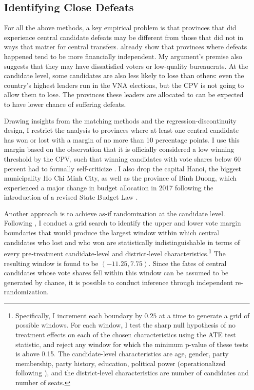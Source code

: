 \documentclass[12pt]{article}
\newcommand\fnote[1]{\footnote{\baselineskip=2\normalbaselineskip#1}}
\newcommand{\1}{\mathbbm{1}}
\begin{document}
\subsection{Identifying Close Defeats}
\label{sec:methods_sample}

For all the above methods, a key empirical problem is that provinces that did experience central candidate defeats may be different from those that did not in ways that matter for central transfers. \citet{MaleskySchuler2011} already show that provinces where defeats happened tend to be more financially independent. My argument's premise also suggests that they may have dissatisfied voters or low-quality bureaucrats. At the candidate level, some candidates are also less likely to lose than others: even the country's highest leaders run in the VNA elections, but the CPV is not going to allow them to lose. The provinces these leaders are allocated to can be expected to have lower chance of suffering defeats. 

Drawing insights from the matching methods and the regression-discontinuity design, I restrict the analysis to provinces where at least one central candidate has won or lost with a margin of no more than 10 percentage points. I use this margin based on the observation that it is officially considered a low winning threshold by the CPV, such that winning candidates with vote shares below 60 percent had to formally self-criticize \citep{MaleskySchuler2011}. I also drop the capital Hanoi, the biggest municipality Ho Chi Minh City, as well as the province of Binh Duong, which experienced a major change in budget allocation in 2017 following the introduction of a revised State Budget Law \citep{BaoViet2016}. 

Another approach is to achieve as-if randomization at the candidate level. Following \citet{CattaneoTitiunik2015}, I conduct a grid search to identify the upper and lower vote margin boundaries that would produce the largest window within which central candidates who lost and who won are statistically indistinguishable in terms of every pre-treatment candidate-level and district-level characteristics.\fnote{Specifically, I  increment each boundary by $0.25$ at a time to generate a grid of possible windows. For each window, I test the sharp null hypothesis of no treatment effects on each of the chosen characteristics using the ATE test statistic, and reject any window for which the minimum p-value of these tests is above 0.15. The candidate-level characteristics are age, gender, party membership, party history, education, political power (operationalized following \citet{MaleskySchuler2011}), and the district-level characteristics are number of candidates and number of seats.} The resulting window is found to be $(-11.25, 7.75)$. Since the fates of central candidates whose vote shares fell within this window can be assumed to be generated by chance, it is possible to conduct inference through independent re-randomization. 
\end{document}
